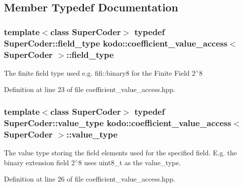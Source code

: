 \subsection{Member Typedef Documentation}
\hypertarget{classkodo_1_1coefficient__value__access_adc855376cdaecd12e14da4257bee281a}{
\subsubsection[{field\-\_\-type}]{\setlength{\rightskip}{0pt plus 5cm}template$<$class Super\-Coder$>$ typedef Super\-Coder\-::field\-\_\-type {\bf kodo\-::coefficient\-\_\-value\-\_\-access}$<$ Super\-Coder $>$\-::{\bf field\-\_\-type}}}\label{classkodo_1_1coefficient__value__access_adc855376cdaecd12e14da4257bee281a}




The finite field type used e.\-g. fifi\-::binary8 for the Finite Field 2$^\wedge$8 

Definition at line 23 of file coefficient\-\_\-value\-\_\-access.\-hpp.

\hypertarget{classkodo_1_1coefficient__value__access_a629750d630f4188d48eb49f76cf750f1}{
\subsubsection[{value\-\_\-type}]{\setlength{\rightskip}{0pt plus 5cm}template$<$class Super\-Coder$>$ typedef Super\-Coder\-::value\-\_\-type {\bf kodo\-::coefficient\-\_\-value\-\_\-access}$<$ Super\-Coder $>$\-::{\bf value\-\_\-type}}}\label{classkodo_1_1coefficient__value__access_a629750d630f4188d48eb49f76cf750f1}




The value type storing the field elements used for the specified field. E.\-g. the binary extension field 2$^\wedge$8 uses uint8\-\_\-t as the value\-\_\-type. 

Definition at line 26 of file coefficient\-\_\-value\-\_\-access.\-hpp.



